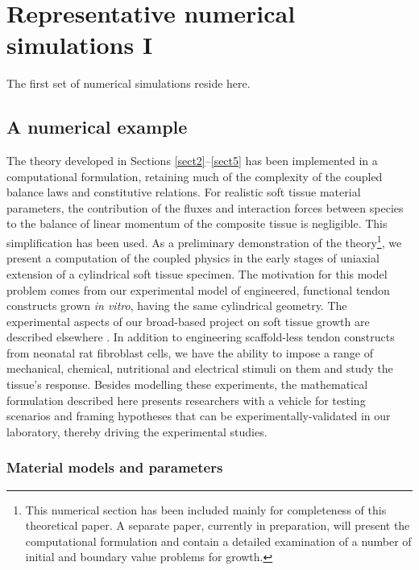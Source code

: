 \chapter{Representative numerical simulations I}
\label{numerical-simulations-1}

The first set of numerical simulations reside here.

\section{A numerical example} \label{sect6}

The theory developed in Sections \ref{sect2}--\ref{sect5} has been
implemented in a computational formulation, retaining much of the
complexity of the coupled balance laws and constitutive relations.
For realistic soft tissue material parameters, the contribution of
the fluxes and interaction forces between species to the balance
of linear momentum of the composite tissue is negligible. This
simplification has been used. As a preliminary demonstration of
the theory\footnote{This numerical section has been included
mainly for completeness of this theoretical paper. A separate
paper, currently in preparation, will present the computational
formulation and contain a detailed examination of a number of
initial and boundary value problems for growth.}, we present a
computation of the coupled physics in the early stages of uniaxial
extension of a cylindrical soft tissue specimen. The motivation
for this model problem comes from our experimental model of
engineered, functional tendon constructs grown \emph{in vitro},
having the same cylindrical geometry. The experimental aspects of
our broad-based project on soft tissue growth are described
elsewhere \citep{Calve:04}. In addition to engineering
scaffold-less tendon constructs from neonatal rat fibroblast
cells, we have the ability to impose a range of mechanical,
chemical, nutritional and electrical stimuli on them and study the
tissue's response. Besides modelling these experiments, the
mathematical formulation described here presents researchers with
a vehicle for testing scenarios and framing hypotheses that can be
experimentally-validated in our laboratory, thereby driving the
experimental studies.

\subsection{Material models and parameters}\label{sect6.1}

